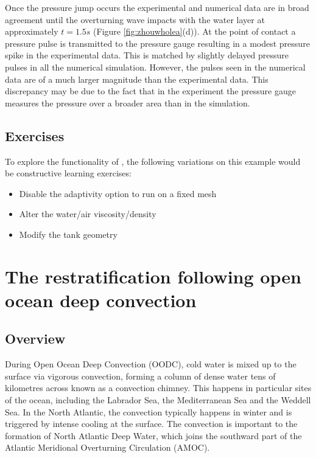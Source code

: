 Once the pressure jump occurs the experimental and numerical data are in broad agreement until the overturning wave impacts with the water layer at approximately $t=1.5s$ (Figure \ref{fig:zhouwholea}(d)).  At the point of contact a pressure pulse is transmitted to the pressure gauge resulting in a modest pressure spike in the experimental data.  This is matched by slightly delayed pressure pulses in all the numerical simulation.  However, the pulses seen in the numerical data are of a much larger magnitude than the experimental data. This discrepancy may be due to the fact that in the experiment the pressure gauge measures the pressure over a broader area than in the simulation. 

\subsection{Exercises}
To explore the functionality of \fluidity, the following variations on this example would be constructive learning exercises:

\begin{itemize}
\item Disable the adaptivity option to run on a fixed mesh
\item Alter the water/air viscosity/density
\item Modify the tank geometry
\end{itemize}





\section{The restratification following open ocean deep convection}
\label{sec:restratification_after_oodc}

\subsection{Overview}

During Open Ocean Deep Convection (OODC), cold water is mixed up to the surface via vigorous convection, forming a column of dense water tens of kilometres across known as a convection chimney. This happens in particular sites of the ocean, including the Labrador Sea, the Mediterranean Sea and the Weddell Sea.  In the North Atlantic, the convection typically happens in winter and is triggered by intense cooling at the surface. The convection is important to the formation of North Atlantic Deep Water, which joins the southward part of the Atlantic Meridional Overturning Circulation (AMOC).

